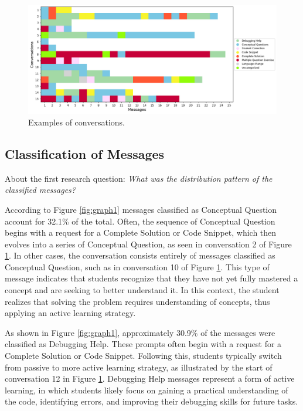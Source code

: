 \documentclass[a4paper,twoside]{article}
\begin{document}
\begin{figure}[htbp]
  \centering
  \includegraphics[scale=0.52]{img/figure2.png}
  \caption{Examples of conversations.}
  \label{fig:graph2}
\end{figure}

\subsection{Classification of Messages}

About the first research question: \textit{What was the distribution pattern of
the classified messages?}

According to Figure \ref{fig:graph1} messages classified as
Conceptual Question account for 32.1\% of the total. Often, the sequence of
Conceptual Question begins with a request for a Complete Solution or Code
Snippet, which then evolves into a series of Conceptual Question, as seen in
conversation 2 of Figure \ref{fig:graph2}. In other cases, the conversation
consists entirely of messages classified as Conceptual Question, such as in
conversation 10 of Figure \ref{fig:graph2}. This type of message indicates that
students recognize that they have not yet fully mastered a concept and are seeking to
better understand it. In this context, the student realizes that solving the
problem requires understanding of concepts, thus applying an active learning
strategy.

As shown in Figure \ref{fig:graph1}, approximately 30.9\% of the messages were
classified as Debugging Help. These prompts often begin with a request for a
Complete Solution or Code Snippet. Following this, students typically switch from
passive to more active learning strategy, as illustrated by the start
of conversation 12 in Figure \ref{fig:graph2}. Debugging Help messages represent
a form of active learning, in which students likely focus on gaining a practical
understanding of the code, identifying errors, and improving their debugging
skills for future tasks.
\end{document}
